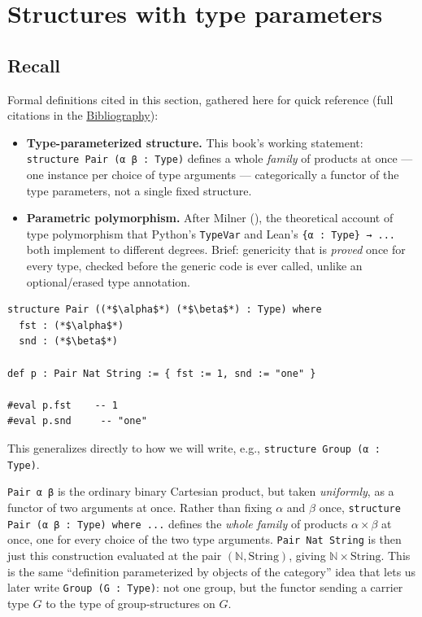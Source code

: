 \section{Structures with type parameters}\label{sec:02-functions-and-structures:02-type-parameters:1}

\subsection{Recall}\label{sec:02-functions-and-structures:02-type-parameters:2}

Formal definitions cited in this section, gathered here for quick reference (full citations in the \hyperref[sec:root:bibliography:1]{Bibliography}):

\begin{itemize}
\tightlist
\item
  \textbf{Type-parameterized structure.} This book's working statement: \texttt{structure Pair (α β : Type)} defines a whole \emph{family} of products at once --- one instance per choice of type arguments --- categorically a functor of the type parameters, not a single fixed structure.
\item
  \textbf{Parametric polymorphism.} After Milner (\cite{Milner1978}), the theoretical account of type polymorphism that Python's \texttt{TypeVar} and Lean's \texttt{\{α : Type\} → ...} both implement to different degrees. Brief: genericity that is \emph{proved} once for every type, checked before the generic code is ever called, unlike an optional/erased type annotation.
\end{itemize}

\begin{lstlisting}
structure Pair ((*$\alpha$*) (*$\beta$*) : Type) where
  fst : (*$\alpha$*)
  snd : (*$\beta$*)

def p : Pair Nat String := { fst := 1, snd := "one" }

#eval p.fst    -- 1
#eval p.snd     -- "one"
\end{lstlisting}

This generalizes directly to how we will write, e.g., \texttt{structure Group (α : Type)}.

\begin{mathreading}

\texttt{Pair α β} is the ordinary binary Cartesian product, but taken \emph{uniformly}, as a functor of two arguments at once. Rather than fixing \(\alpha\) and \(\beta\) once, \texttt{structure Pair (α β : Type) where ...} defines the \emph{whole family} of products \(\alpha \times \beta\) at once, one for every choice of the two type arguments. \texttt{Pair Nat String} is then just this construction evaluated at the pair \((\mathbb{N},
\mathrm{String})\), giving \(\mathbb{N} \times \mathrm{String}\). This is the same ``definition parameterized by objects of the category'' idea that lets us later write \texttt{Group (G : Type)}: not one group, but the functor sending a carrier type \(G\) to the type of group-structures on \(G\).

\end{mathreading}

